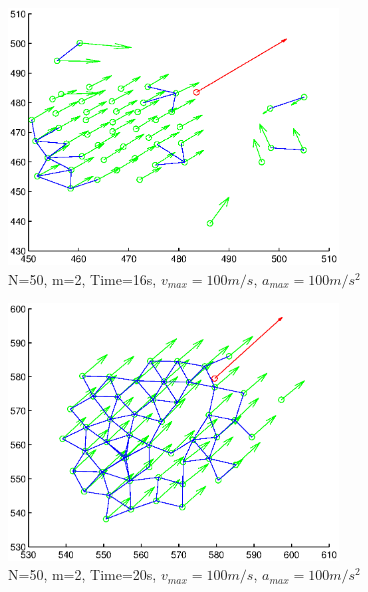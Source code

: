 \documentclass[10pt, conference]{IEEEtran}
\begin{document}
\begin{figure}[!h]
  \begin{center}
    \includegraphics[width=3.45in]{n50m2vmax100amax100t16}
  \end{center}

  \caption{\small N=50, m=2, Time=16s, $v_{max}=100m/s$, $a_{max}=100m/s^2$}
  \label{fig:n50m2vmax100amax100t16}
\end{figure}

\begin{figure}[!h]
  \begin{center}
    \includegraphics[width=3.45in]{n50m2vmax100amax100t20}
  \end{center}

  \caption{\small N=50, m=2, Time=20s, $v_{max}=100m/s$, $a_{max}=100m/s^2$}
  \label{fig:n50m2vmax100amax100t20}
\end{figure}

\clearpage
\end{document}
